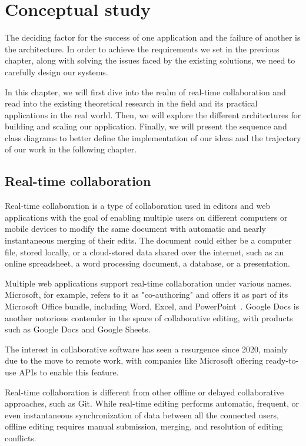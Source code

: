 \chapter{Conceptual study}
\label{chap:conceptual}

The deciding factor for the success of one application and the failure of another is the architecture.
In order to achieve the requirements we set in the previous chapter, along with solving the issues faced by the existing solutions, we need to carefully design our systems.

In this chapter, we will first dive into the realm of real-time collaboration and read into the existing theoretical research in the field and its practical applications in the real world.
Then, we will explore the different architectures for building and scaling our application. Finally, we will present the sequence and class diagrams to better define the implementation of our ideas and the trajectory of our work in the following chapter.

\section{Real-time collaboration}

Real-time collaboration is a type of collaboration used in editors and web applications with the goal of enabling multiple users on different computers or mobile devices to modify the same document with automatic and nearly instantaneous merging of their edits.
The document could either be a computer file, stored locally, or a cloud-stored data shared over the internet, such as an online spreadsheet, a word processing document, a database, or a presentation.

Multiple web applications support real-time collaboration under various names.
Microsoft, for example, refers to it as "co-authoring" and offers it as part of its Microsoft Office bundle, including Word, Excel, and PowerPoint~\autocite{noauthor_document_nodate}.
Google Docs is another notorious contender in the space of collaborative editing, with products such as Google Docs and Google Sheets.

The interest in collaborative software has seen a resurgence since 2020, mainly due to the move to remote work, with companies like Microsoft offering ready-to-use APIs to enable this feature.

Real-time collaboration is different from other offline or delayed collaborative approaches, such as Git.
While real-time editing performs automatic, frequent, or even instantaneous synchronization of data between all the connected users, offline editing requires manual submission, merging, and resolution of editing conflicts.


